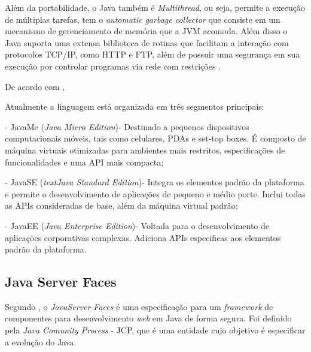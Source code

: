 \par Além da portabilidade, o Java também é \textit{Multithread}, ou seja,
permite a execução de múltiplas tarefas, tem o \textit{automatic garbage
collector} que consiste em um mecanismo de gerenciamento de memória que a JVM
acomoda. Além disso o Java suporta uma extensa biblioteca de rotinas que
facilitam a interação com protocolos TCP/IP, como HTTP e FTP, além de possuir uma
segurança em sua execução por controlar programas via rede com
restrições \cite{livro_java_complete_references}.

\par De acordo com , 

\begin{citacao} Atualmente a linguagem está organizada em três segmentos
principais:


	- JavaMe (\textit{Java Micro Edition})- Destinado a pequenos dispositivos
	computacionais móveis, tais como celulares, PDAs e set-top boxes. É composto de máquina virtuais otimizadas para ambientes mais restritos, especificações de 
funcionalidades e uma API mais compacta; 
	  
	- JavaSE (\textit{textJava Standard Edition})- Integra os elementos padrão
	da plataforma e permite o desenvolvimento de aplicações de pequeno e médio porte. Inclui todas as APIs consideradas de base,
além da máquina virtual padrão;

	- JavaEE (\textit{Java Enterprise Edition})- Voltada para o desenvolvimento
	de aplicações corporativas complexas. Adiciona APIs especificas aos elementos padrão da plataforma.
	

\end{citacao}


 \subsection{Java Server Faces}
 
 \par Segundo , o \textit{JavaServer
 Faces} é uma especificação para um \textit{framework} de componentes para
 desenvolvimento \textit{web} em Java de forma segura. Foi definido pela
 \textit{Java Comunity Process} - JCP\footnotemark[3], que é uma entidade cujo
 objetivo é especificar a evolução do Java.
 
 

